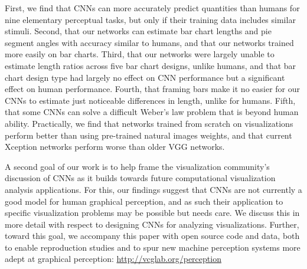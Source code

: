 First, we find that CNNs can more accurately predict quantities than humans for nine elementary perceptual tasks, but only if their training data includes similar stimuli. Second, that our networks can estimate bar chart lengths and pie segment angles with accuracy similar to humans, and that our networks trained more easily on bar charts. Third, that our networks were largely unable to estimate length ratios across five bar chart designs, unlike humans, and that bar chart design type had largely no effect on CNN performance but a significant effect on human performance. Fourth, that framing bars make it no easier for our CNNs to estimate just noticeable differences in length, unlike for humans. Fifth, that some CNNs can solve a difficult Weber's law problem that is beyond human ability. Practically, we find that networks trained from scratch on visualizations perform better than using pre-trained natural images weights, and that current Xception networks perform worse than older VGG networks.

A second goal of our work is to help frame the visualization community's discussion of CNNs as it builds towards future computational visualization analysis applications. For this, our findings suggest that CNNs are not currently a good model for human graphical perception, and as such their application to specific visualization problems may be possible but needs care. We discuss this in more detail with respect to designing CNNs for analyzing visualizations. Further, toward this goal, we accompany this paper with open source code and data, both to enable reproduction studies and to spur new machine perception systems more adept at graphical perception: \url{http://vcglab.org/perception}




